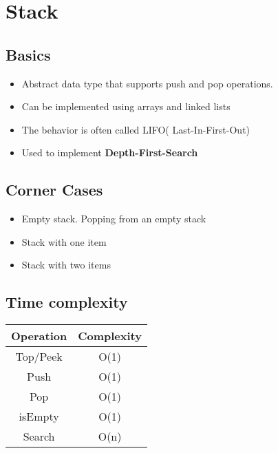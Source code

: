 \chapter{Stack}

\section{Basics}
	\begin{itemize}
		\item Abstract data type that supports push and pop operations.
		\item Can be implemented using arrays and linked lists
		\item The behavior is often called LIFO( Last-In-First-Out)
		\item Used to implement \textbf{Depth-First-Search}
	\end{itemize}
	
	\section{Corner Cases}
		\begin{itemize}
			\item Empty stack. Popping from an empty stack
			\item Stack with one item
			\item Stack with two items
		\end{itemize}
		
	
	\section{Time complexity}
	
	\begin{center}
		\begin{tabular}{||c c||}
		\hline
		Operation & Complexity\\
		\hline\hline
		Top/Peek & O(1)\\
		\hline
		Push & O(1)\\
		\hline
		Pop & O(1)\\
		\hline
		isEmpty & O(1)\\
		\hline
		Search & O(n)\\
		\hline
			
		\end{tabular}
	\end{center}
	
	
	